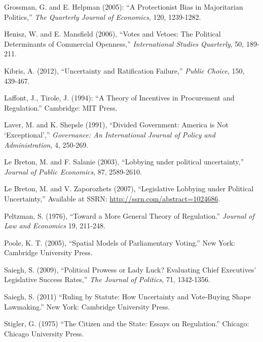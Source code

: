 \documentclass[12pt]{article}
\begin{document}
\begin{list}{}{\setlength{\leftmargin}{0.3in}\setlength{\rightmargin}{0.0in}\setlength{\itemindent}{-0.3in}\setlength{\itemsep}{0.0in}}
\item Grossman, G. and E. Helpman (2005): ``A Protectionist Bias in Majoritarian Politics,'' {\em The Quarterly Journal of Economics}, 120, 1239-1282.

\item Henisz, W. and E. Mansfield (2006), ``Votes and Vetoes: The Political Determinants of Commercial Openness,'' {\em International Studies Quarterly}, 50, 189-211.

\item Kibris, A. (2012), ``Uncertainty and Ratification Failure,'' {\em Public Choice}, 150, 439-467.

\item Laffont, J., Tirole, J. (1994): ``A Theory of Incentives in Procurement and Regulation.'' Cambridge: MIT Press.

\item Laver, M. and K. Shepsle (1991), ``Divided Government: America is Not `Exceptional','' {\em Governance: An International Journal of Policy and Administration}, 4, 250-269.

\item Le Breton, M. and F. Salanie (2003), ``Lobbying under political uncertainty,'' {\em Journal of Public Economics}, 87, 2589-2610.

\item Le Breton, M. and V. Zaporozhets (2007), ``Legislative Lobbying under Political Uncertainty,'' Available at SSRN: \url{http://ssrn.com/abstract=1024686}.

\item Peltzman, S. (1976), ``Toward a More General Theory of Regulation.'' {\em Journal of Law and Economics} 19, 211-248.

\item Poole, K. T. (2005), ``Spatial Models of Parliamentary Voting.'' New York: Cambridge University Press.

\item Saiegh, S. (2009), ``Political  Prowess or Lady Luck? Evaluating Chief Executives' Legislative Success Rates,'' {\em The Journal of Politics}, 71, 1342-1356.

\item Saiegh, S. (2011) ``Ruling by Statute: How Uncertainty and Vote-Buying Shape Lawmaking.'' New York: Cambridge University Press.

\item Stigler, G. (1975) ``The Citizen and the State: Essays on Regulation.'' Chicago: Chicago University Press.


\end{list}
\end{document}
